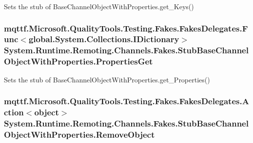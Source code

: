Sets the stub of Base\-Channel\-Object\-With\-Properties.\-get\-\_\-\-Keys()

\hypertarget{class_system_1_1_runtime_1_1_remoting_1_1_channels_1_1_fakes_1_1_stub_base_channel_object_with_properties_a196b15fb9f5a45d5a0dc9af5666572b2}{
\subsubsection[{Properties\-Get}]{\setlength{\rightskip}{0pt plus 5cm}mqttf.\-Microsoft.\-Quality\-Tools.\-Testing.\-Fakes.\-Fakes\-Delegates.\-Func$<$global.\-System.\-Collections.\-I\-Dictionary$>$ System.\-Runtime.\-Remoting.\-Channels.\-Fakes.\-Stub\-Base\-Channel\-Object\-With\-Properties.\-Properties\-Get}}\label{class_system_1_1_runtime_1_1_remoting_1_1_channels_1_1_fakes_1_1_stub_base_channel_object_with_properties_a196b15fb9f5a45d5a0dc9af5666572b2}


Sets the stub of Base\-Channel\-Object\-With\-Properties.\-get\-\_\-\-Properties()

\hypertarget{class_system_1_1_runtime_1_1_remoting_1_1_channels_1_1_fakes_1_1_stub_base_channel_object_with_properties_a9e13c100b0ba0e7330f6b617ef7e09b3}{
\subsubsection[{Remove\-Object}]{\setlength{\rightskip}{0pt plus 5cm}mqttf.\-Microsoft.\-Quality\-Tools.\-Testing.\-Fakes.\-Fakes\-Delegates.\-Action$<$object$>$ System.\-Runtime.\-Remoting.\-Channels.\-Fakes.\-Stub\-Base\-Channel\-Object\-With\-Properties.\-Remove\-Object}}\label{class_system_1_1_runtime_1_1_remoting_1_1_channels_1_1_fakes_1_1_stub_base_channel_object_with_properties_a9e13c100b0ba0e7330f6b617ef7e09b3}


